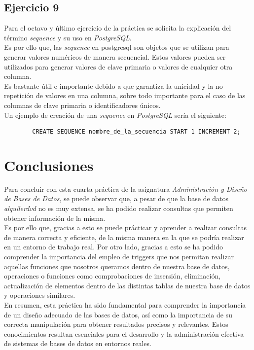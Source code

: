 \documentclass[10pt]{report}
\begin{document}
	\section{Ejercicio 9}
	Para el octavo y último ejercicio de la práctica se solicita la explicación del término \emph{sequence} y su uso en \emph{PostgreSQL}.
\\
	Es por ello que, las \emph{sequence} en postgresql son objetos que se utilizan para generar valores numéricos de manera secuencial. Estos valores pueden ser utilizados para generar valores de clave primaria o valores de cualquier otra columna.
\\
	Es bastante útil e importante debido a que garantiza la unicidad y la no repetición de valores en una columna, sobre todo importante para el caso de las columnas de clave primaria o identificadores únicos.
\\
	Un ejemplo de creación de una \emph{sequence} en \emph{PostgreSQL} sería el siguiente:

	\begin{verbatim}
		CREATE SEQUENCE nombre_de_la_secuencia START 1 INCREMENT 2;
	\end{verbatim}

	\chapter{Conclusiones}
  Para concluir con esta cuarta práctica de la asignatura \emph{Administración y Diseño de Bases de Datos}, se puede observar que, a pesar de que la base de datos \emph{alquilerdvd} no es muy extensa, se ha podido realizar consultas que permiten obtener información de la misma.
\\
	Es por ello que, gracias a esto se puede prácticar y aprender a realizar consultas de manera correcta y eficiente, de la misma manera en la que se podría realizar en un entorno de trabajo real. Por otro lado, gracias a esto se ha podido comprender la importancia del empleo de triggers que nos permitan realizar aquellas funciones que nosotros queramos dentro de nuestra base de datos, operaciones o funciones como comprobaciones de insersión, eliminación, actualización de elementos dentro de las distintas tablas de nuestra base de datos y operaciones similares. 
\\
	En resumen, esta práctica ha sido fundamental para comprender la importancia de un diseño adecuado de las bases de datos, así como la importancia de su correcta manipulación para obtener resultados precisos y relevantes. Estos conocimientos resultan esenciales para el desarrollo y la administración efectiva de sistemas de bases de datos en entornos reales. 
\\
\end{document}
